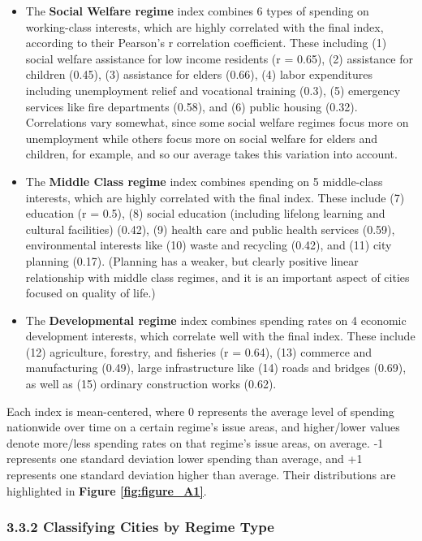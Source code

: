 \documentclass[preprint, 3p,
authoryear]{elsarticle} %
\begin{document}
\begin{itemize}
\item
  The \textbf{Social Welfare regime} index combines 6 types of spending
  on working-class interests, which are highly correlated with the final
  index, according to their Pearson's r correlation coefficient. These
  including (1) social welfare assistance for low income residents (r =
  0.65), (2) assistance for children (0.45), (3) assistance for elders
  (0.66), (4) labor expenditures including unemployment relief and
  vocational training (0.3), (5) emergency services like fire
  departments (0.58), and (6) public housing (0.32). Correlations vary
  somewhat, since some social welfare regimes focus more on unemployment
  while others focus more on social welfare for elders and children, for
  example, and so our average takes this variation into account.
\item
  The \textbf{Middle Class regime} index combines spending on 5
  middle-class interests, which are highly correlated with the final
  index. These include (7) education (r = 0.5), (8) social education
  (including lifelong learning and cultural facilities) (0.42), (9)
  health care and public health services (0.59), environmental interests
  like (10) waste and recycling (0.42), and (11) city planning (0.17).
  (Planning has a weaker, but clearly positive linear relationship with
  middle class regimes, and it is an important aspect of cities focused
  on quality of life.)
\item
  The \textbf{Developmental regime} index combines spending rates on 4
  economic development interests, which correlate well with the final
  index. These include (12) agriculture, forestry, and fisheries (r =
  0.64), (13) commerce and manufacturing (0.49), large infrastructure
  like (14) roads and bridges (0.69), as well as (15) ordinary
  construction works (0.62).
\end{itemize}

Each index is mean-centered, where 0 represents the average level of
spending nationwide over time on a certain regime's issue areas, and
higher/lower values denote more/less spending rates on that regime's
issue areas, on average. -1 represents one standard deviation lower
spending than average, and +1 represents one standard deviation higher
than average. Their distributions are highlighted in
\textbf{Figure \ref{fig:figure_A1}}.

\hypertarget{classifying-cities-by-regime-type}{%
\subsubsection{3.3.2 Classifying Cities by Regime
Type}\label{classifying-cities-by-regime-type}}
\end{document}

